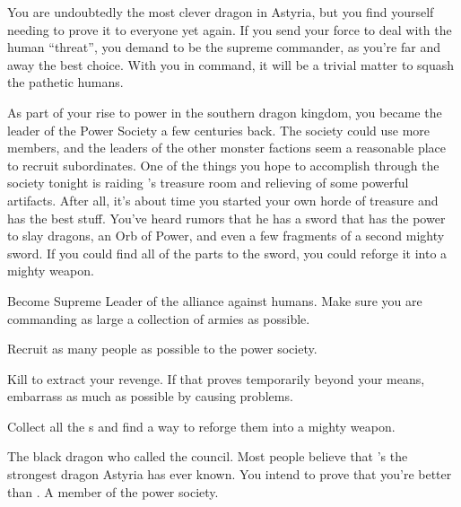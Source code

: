 \documentclass[char]{guildcamp2}
\begin{document}
You are undoubtedly the most clever dragon in Astyria, but you find yourself needing to prove it to everyone yet again. If you send your force to deal with the human ``threat'', you demand to be the supreme commander, as you're far and away the best choice.  With you in command, it will be a trivial matter to squash the pathetic humans.
		
As part of your rise to power in the southern dragon kingdom, you became the leader of the Power Society a few centuries back. The society could use more members, and the leaders of the other monster factions seem a reasonable place to recruit subordinates. One of the things you hope to accomplish through the society tonight is raiding \cOnyx{}'s treasure room and relieving \cOnyx{\them} of some powerful artifacts. After all, it's about time you started your own horde of treasure and \cOnyx{} has the best stuff. You've heard rumors that he has a sword that has the power to slay dragons, an Orb of Power, and even a few fragments of a second mighty sword. If you could find all of the parts to the sword, you could reforge it into a mighty weapon.		

	\begin{itemz}[Goals]
	\item Become Supreme Leader of the alliance against humans. Make sure you are commanding as large a collection of armies as possible.
	\item Recruit as many people as possible to the power society.
	\item Kill \cOnyx{} to extract your revenge. If that proves temporarily beyond your means, embarrass \cOnyx{} as much as possible by causing problems.
	\item Collect all the \iVorpalSwordofWonder{}s and find a way to reforge them into a mighty weapon.
\end{itemz}

\begin{contacts}
  \contact{\cOnyx{}} The black dragon who called the council. Most people believe that \cOnyx{\they}'s the strongest dragon Astyria has ever known. You intend to prove that you're better than \cOnyx{\them}.
	\contact{\cMinotaur{}} A member of the power society.
\end{contacts}
\end{document}
